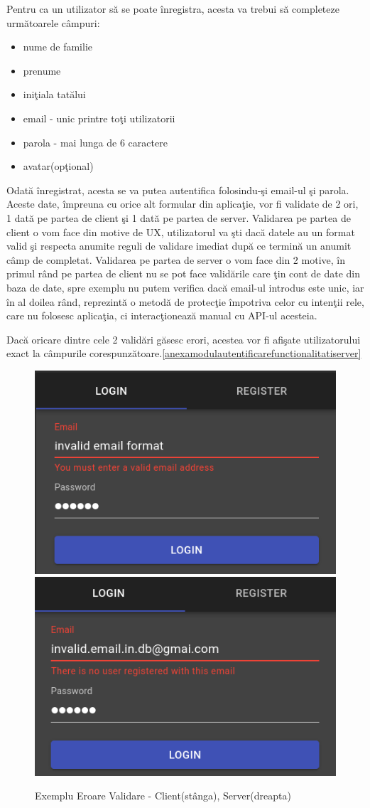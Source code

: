 \documentclass[12pt, a4paper, oneside, romanian]{teza-upb}
\begin{document}
Pentru ca un utilizator să se poate înregistra, acesta va trebui să completeze următoarele câmpuri:
\begin{itemize}
	\item nume de familie
	\item prenume
	\item iniţiala tatălui
	\item email - unic printre toţi utilizatorii
	\item parola - mai lunga de 6 caractere
	\item avatar(opţional)
\end{itemize}

Odată înregistrat, acesta se va putea autentifica folosindu-şi email-ul şi parola.\\

Aceste date, împreuna cu orice alt formular din aplicaţie, vor fi validate de 2 ori, 1 dată pe partea de client şi 1 dată pe partea de server. Validarea pe partea de client o vom face din motive de UX, utilizatorul va şti dacă datele au un format valid şi respecta anumite reguli de validare imediat după ce termină un anumit câmp de completat. Validarea pe partea de server o vom face din 2 motive, în primul rând pe partea de client nu se pot face validările care ţin cont de date din baza de date, spre exemplu nu putem verifica dacă email-ul introdus este unic, iar în al doilea rând, reprezintă o metodă de protecţie împotriva celor cu intenţii rele, care nu folosesc aplicaţia, ci interacţionează manual cu API-ul acesteia.\cite{formularbunepractici}

Dacă oricare dintre cele 2 validări găsesc erori, acestea vor fi afişate utilizatorului exact la câmpurile corespunzătoare.\ref{anexamodulautentificarefunctionalitatiserver}

\begin{figure}[H]
\centering
\includegraphics*[width=0.45\columnwidth]{exemplu-eroare-validare-frontend}
\includegraphics*[width=0.45\columnwidth]{exemplu-eroare-validare-backend}
\caption{Exemplu Eroare Validare - Client(stânga), Server(dreapta)}
\label{exemplu-eroare-validare}
\end{figure}
\end{document}
